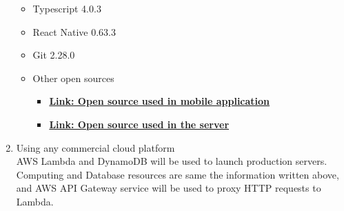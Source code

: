 \documentclass[conference]{IEEEtran}
\begin{document}
\begin{enumerate}
\begin{itemize}
        \item Typescript 4.0.3
        \item React Native 0.63.3
        \item Git 2.28.0 
        \item Other open sources
            \begin{itemize}
                \item \href{https://github.com/6-things-must-to-do/app/blob/develop/package.json}{\textbf{Link: Open source used in mobile application}}
                \item \href{https://github.com/6-things-must-to-do/backend/blob/develop/go.mod}{\textbf{Link: Open source used in the server}}
            \end{itemize}
    \end{itemize}
    \item Using any commercial cloud platform \\
    
    AWS Lambda and DynamoDB will be used to launch production servers.  Computing and Database resources are same the information written above, and AWS API Gateway service will be used to proxy HTTP requests to Lambda. \\
    
\end{enumerate}
\end{document}
